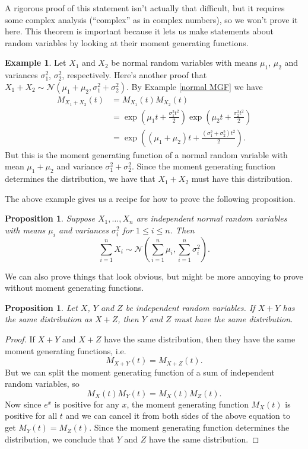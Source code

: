 \documentclass[12pt]{article}
\theoremstyle{plain}
\newtheorem{proposition}[theorem]{Proposition}
\theoremstyle{definition}
\newtheorem{example}[theorem]{Example}
\theoremstyle{remark}
\begin{document}
A rigorous proof of this statement isn't actually that difficult, but it requires some complex analysis (``complex'' as in complex numbers), so we won't prove it here.
This theorem is important because it lets us make statements about random variables by looking at their moment generating functions.

\begin{example}
    Let $X_1$ and $X_2$ be normal random variables with means $\mu_1$, $\mu_2$ and variances $\sigma_1^2$, $\sigma_2^2$, respectively.
    Here's another proof that $X_1 + X_2 \sim \mathcal{N}(\mu_1+\mu_2, \sigma_1^2+\sigma_2^2)$.
    By Example \ref{normal MGF} we have
    \begin{align*}
        M_{X_1+X_2}(t) &= M_{X_1}(t)M_{X_2}(t)\\
        &= \exp\left(\mu_1t + \frac{\sigma_1^2t^2}{2}\right)\exp\left(\mu_2t + \frac{\sigma_2^2t^2}{2}\right)\\
        &=\exp\left((\mu_1+\mu_2)t + \frac{(\sigma_1^2+\sigma_2^2)t^2}{2}\right).
    \end{align*}
    But this is the moment generating function of a normal random variable with mean $\mu_1+\mu_2$ and variance $\sigma_1^2+\sigma_2^2$.
    Since the moment generating function determines the distribution, we have that $X_1+X_2$ must have this distribution.
\end{example}

The above example gives us a recipe for how to prove the following proposition.
\begin{proposition}
    Suppose $X_1, \ldots, X_n$ are independent normal random variables with means $\mu_i$ and variances $\sigma_i^2$ for $1\leq i\leq n$.
    Then
    \[
        \sum_{i=1}^nX_i \sim \mathcal{N}\left(\sum_{i=1}^n\mu_i, \sum_{i=1}^n\sigma_i^2\right).
    \]
\end{proposition}

We can also prove things that look obvious, but might be more annoying to prove without moment generating functions.
\begin{proposition}
    Let $X$, $Y$ and $Z$ be independent random variables.
    If $X+Y$ has the same distribution as $X+Z$, then $Y$ and $Z$ must have the same distribution.
\end{proposition}
\begin{proof}
    If $X+Y$ and $X+Z$ have the same distribution, then they have the same moment generating functions, i.e.
    \[
        M_{X+Y}(t) = M_{X+Z}(t).
    \]
    But we can split the moment generating function of a sum of independent random variables, so
    \[
        M_X(t)M_Y(t) = M_X(t)M_Z(t).
    \]
    Now since $e^x$ is positive for any $x$, the moment generating function $M_X(t)$ is positive for all $t$ and we can cancel it from both sides of the above equation to get $M_Y(t) =M_Z(t)$.
    Since the moment generating function determines the distribution, we conclude that $Y$ and $Z$ have the same distribution.
\end{proof}
\end{document}

